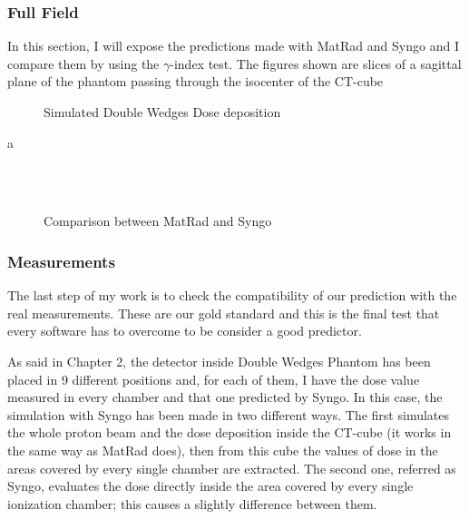 \documentclass[12pt, a4paper, twoside]{book}
\begin{document}
\subsubsection{Full Field}

In this section, I will expose the predictions made with MatRad and Syngo and I compare them by using the $\gamma$-index test. The figures shown are slices of a sagittal plane of the phantom passing through the isocenter of the CT-cube
\begin{figure}[!ht]
\centering
{} \quad
{} \quad
\caption{Simulated Double Wedges Dose deposition}
\label{fig:SyngoMat}
\end{figure}

a

\begin{figure}[t]
\centering
{} \\
 \\
 \quad
\caption{Comparison between MatRad and Syngo}
\label{fig:SyngoMat2}
\end{figure}

\subsubsection{Measurements}
The last step of my work is to check the compatibility of our prediction with the real measurements. These are our gold standard and this is the final test that every software has to overcome to be consider a good predictor.

As said in Chapter 2, the detector inside Double Wedges Phantom has been placed in 9 different positions and, for each of them, I have the dose value measured in every chamber and that one predicted by Syngo. In this case, the simulation with Syngo has been made in two different ways. The first simulates the whole proton beam and the dose deposition inside the CT-cube (it works in the same way as MatRad does), then from this cube the values of dose in the areas covered by every single chamber are extracted. The second one, referred as Syngo, evaluates the dose directly inside the area covered by every single ionization chamber; this causes a slightly difference between them.
\end{document}
